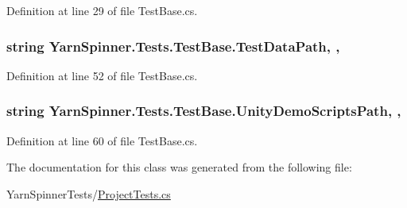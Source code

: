Definition at line 29 of file Test\-Base.\-cs.

\hypertarget{a00160_aa9b4d902d61adad7165154a265f69aa4}{
\subsubsection[{Test\-Data\-Path}]{\setlength{\rightskip}{0pt plus 5cm}string Yarn\-Spinner.\-Tests.\-Test\-Base.\-Test\-Data\-Path\hspace{0.3cm}{\ttfamily [static]}, {\ttfamily [get]}, {\ttfamily [inherited]}}}\label{a00160_aa9b4d902d61adad7165154a265f69aa4}


Definition at line 52 of file Test\-Base.\-cs.

\hypertarget{a00160_a39922286f6255e4fd0e433a4fc7521c4}{
\subsubsection[{Unity\-Demo\-Scripts\-Path}]{\setlength{\rightskip}{0pt plus 5cm}string Yarn\-Spinner.\-Tests.\-Test\-Base.\-Unity\-Demo\-Scripts\-Path\hspace{0.3cm}{\ttfamily [static]}, {\ttfamily [get]}, {\ttfamily [inherited]}}}\label{a00160_a39922286f6255e4fd0e433a4fc7521c4}


Definition at line 60 of file Test\-Base.\-cs.



The documentation for this class was generated from the following file\-:\begin{DoxyCompactItemize}
\item 
Yarn\-Spinner\-Tests/\hyperlink{a00312}{Project\-Tests.\-cs}\end{DoxyCompactItemize}
